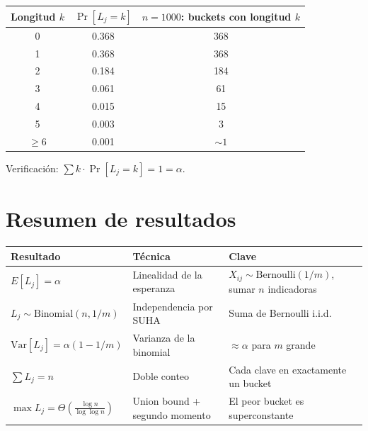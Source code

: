 \documentclass[11pt, letterpaper]{article}
\theoremstyle{definition}
\theoremstyle{plain}
\theoremstyle{remark}
\begin{document}
\begin{table}[h]
\centering
\begin{tabular}{ccc}
\toprule
Longitud $k$ & $\Pr[L_j = k]$ & $n{=}1000$: buckets con longitud $k$ \\
\midrule
0        & 0.368 & 368 \\
1        & 0.368 & 368 \\
2        & 0.184 & 184 \\
3        & 0.061 & 61  \\
4        & 0.015 & 15  \\
5        & 0.003 & 3   \\
$\geq 6$ & 0.001 & ${\sim}1$ \\
\bottomrule
\end{tabular}
\end{table}

Verificación: $\sum k \cdot \Pr[L_j = k] = 1 = \alpha$. \checkmark

\section{Resumen de resultados}

\begin{table}[h]
\centering
\begin{tabular}{llp{5.5cm}}
\toprule
\textbf{Resultado} & \textbf{Técnica} & \textbf{Clave} \\
\midrule
$E[L_j] = \alpha$
  & Linealidad de la esperanza
  & $X_{ij} \sim \mathrm{Bernoulli}(1/m)$, sumar $n$ indicadoras \\
$L_j \sim \mathrm{Binomial}(n, 1/m)$
  & Independencia por SUHA
  & Suma de Bernoulli i.i.d. \\
$\mathrm{Var}[L_j] = \alpha(1{-}1/m)$
  & Varianza de la binomial
  & $\approx \alpha$ para $m$ grande \\
$\sum L_j = n$
  & Doble conteo
  & Cada clave en exactamente un bucket \\
$\max L_j = \Theta(\frac{\log n}{\log\log n})$
  & Union bound + segundo momento
  & El peor bucket es superconstante \\
\bottomrule
\end{tabular}
\end{table}
\end{document}
